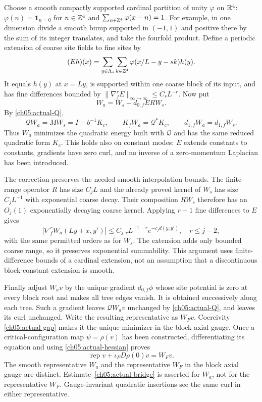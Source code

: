Choose a smooth compactly supported cardinal partition of unity
$\varphi$ on $\mathbb R^4$: $\varphi(n)=\mathbf1_{n=0}$ for $n\in\mathbb Z^4$ and
$\sum_{n\in\mathbb Z^4}\varphi(x-n)=1$. For example, in one dimension divide a
smooth bump supported in $(-1,1)$ and positive there by the sum of its
integer translates, and take the fourfold product. Define a periodic
extension of coarse site fields to fine sites by
\[
 (E h)(x)=\sum_{y\in\Lambda_s}\sum_{k\in\mathbb Z^4}
                \varphi(x/L-y-sk)h(y).
\]
It equals $h(y)$ at $x=Ly$, is supported within one coarse block of its
input, and has fine differences bounded by
$\|\nabla_f^rE\|_{\infty\to\infty}\le C_rL^{-r}$. Now put
\begin{equation}
 W_a=W_s-d_{0,f}ERW_s.
 \label{ch05:corrected-transport}
\end{equation}
By \eqref{ch05:actual-Q},
\begin{equation}
 \mathcal QW_a=MW_s=I-b^{-1}K_c,
 \qquad K_fW_a=\mathcal Q^*K_c,
 \qquad d_{1,f}W_a=d_{1,f}W_s.
 \label{ch05:actual-transport-identities}
\end{equation}
Thus $W_a$ minimizes the quadratic energy built with $\mathcal Q$ and has the same reduced
quadratic form $K_c$. This holds also on constant modes: $E$ extends
constants to constants, gradients have zero curl, and no inverse of a
zero-momentum Laplacian has been introduced.

The correction preserves the needed smooth interpolation bounds. The
finite-range operator $R$ has size $C_jL$ and the already proved kernel of
$W_s$ has size $C_jL^{-1}$ with exponential coarse decay. Their composition
$RW_s$ therefore has an $O_j(1)$ exponentially decaying coarse kernel.
Applying $r+1$ fine differences to $E$ gives
\begin{equation}
 |\nabla_f^rW_a(Ly+x,y')|
       \le C_{j,r}L^{-1-r}e^{-c_jd(y,y')},
 \quad r\le j-2,
 \label{ch05:actual-bridge}
\end{equation}
with the same permitted orders as for $W_s$. The extension adds only
bounded coarse range, so it preserves exponential summability. This
argument uses finite-difference bounds of a cardinal extension, not an
assumption that a discontinuous block-constant extension is smooth.

Finally adjust $W_av$ by the unique gradient $d_{0,f}\phi$ whose site
potential is zero at every block root and makes all tree edges vanish.
It is obtained successively along each tree. Such a gradient leaves
$\mathcal QW_av$ unchanged by \eqref{ch05:actual-Q}, and leaves its curl
unchanged. Write the resulting representative as $W_Fv$. Coercivity
\eqref{ch05:actual-gap} makes it the unique minimizer in the block axial gauge.
Once a critical-configuration map $\psi=\rho(v)$ has been constructed, differentiating
its equation and using \eqref{ch05:actual-hessian} proves
\begin{equation}
 \operatorname{rep}v+\iota_FD\rho(0)v=W_Fv.
 \label{ch05:stationary-tangent}
\end{equation}
The smooth representative $W_a$ and the representative $W_F$ in the block axial gauge are
distinct. Estimate~\eqref{ch05:actual-bridge} is asserted for $W_a$, not
for the representative $W_F$. Gauge-invariant quadratic insertions see the same
curl in either representative.

